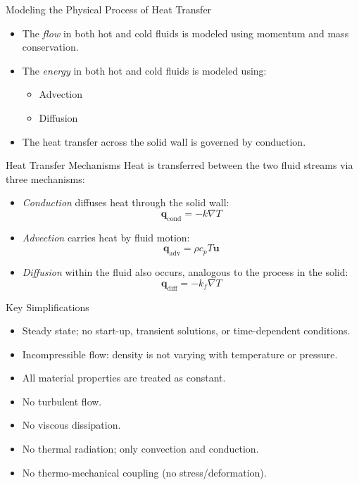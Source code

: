 \documentclass{beamer}
\begin{document}
	\begin{frame}{Modeling the Physical Process of Heat Transfer}
		\begin{itemize}
			\item The \emph{flow} in both hot and cold fluids is modeled using momentum and mass conservation. 
			\pause
			\item The \emph{energy} in both hot and cold fluids is modeled using:
		\begin{itemize}
			\item Advection
			\item Diffusion
		\end{itemize}
		\pause
		\item The heat transfer across the solid wall is governed by conduction. 
		\end{itemize}
	\end{frame}
	
\begin{frame}{Heat Transfer Mechanisms}
	Heat is transferred between the two fluid streams via three mechanisms:
	\begin{itemize}
		\item \emph{Conduction} diffuses heat through the solid wall:
		\begin{equation*}
			\mathbf{q}_\text{cond} = -k \nabla T
		\end{equation*}
		\pause
		\item \emph{Advection} carries heat by fluid motion:
		\begin{equation*}
			\mathbf{q}_\text{adv} = \rho c_p T \mathbf{u}
		\end{equation*}
		\pause
		\item \emph{Diffusion} within the fluid also occurs, analogous to the process in the solid:
		\begin{equation*}
			\mathbf{q}_\text{diff} = -k_f \nabla T
		\end{equation*}
	\end{itemize}
\end{frame}

	\begin{frame}{Key Simplifications}
		\begin{itemize}
			\item Steady state; no start-up, transient solutions, or time-dependent conditions.
			\pause
			\item Incompressible flow: density is not varying with temperature or pressure. 
			\pause
			\item All material properties are treated as constant.
			\pause
			\item No turbulent flow. 
			\pause
			\item No viscous dissipation.
			\pause 
			\item No thermal radiation; only convection and conduction. 
			\pause
			\item No thermo-mechanical coupling (no stress/deformation). 
		\end{itemize}
	\end{frame}
\end{document}

